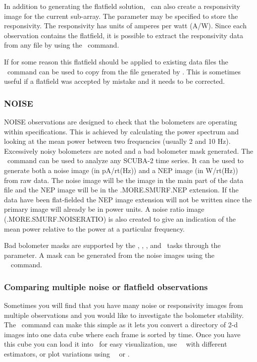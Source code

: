 \documentclass[oneside,11pt]{starlink}
\begin{document}
In addition to generating the flatfield solution, \calcflat\ can also
create a responsivity image for the current sub-array. The
 parameter may be specified to store the
responsivity. The responsivity has units of amperes per watt
(A/W). Since each observation contains the flatfield, it is possible
to extract the responsivity data from any file by using the \calcresp\
command.

If for some reason this flatfield should be applied to existing data
files the \copyflat\ command can be used to copy from the file
generated by \calcflat. This is sometimes useful if a flatfield was
accepted by mistake and it needs to be corrected.

\subsubsection{NOISE}

NOISE observations are designed to check that the bolometers are
operating within specifications. This is achieved by calculating the
power spectrum and looking at the mean power between two frequencies
(usually 2 and 10 Hz). Excessively noisy bolometers are noted and a bad
bolometer mask generated.  The \calcnoise\ command can be used to
analyze any SCUBA-2 time series. It can be used to generate both a
noise image (in pA/rt(Hz)) and a NEP image (in W/rt(Hz)) from raw
data. The noise image will be the image in the main part of the data
file and the NEP image will be in the .MORE.SMURF.NEP extension. If
the data have been flat-fielded the NEP image extension will not be
written since the primary image will already be in power units. A
noise ratio image (.MORE.SMURF.NOISERATIO) is also created to give an
indication of the mean power relative to the power at a particular frequency.

Bad bolometer masks are supported by the \flatfield, \extinction,
\remsky, and \makemap\ tasks through the \aparam{BBM}
parameter. A mask can be generated from the noise images using the
\KAPPA\ \thresh\ command.

\subsubsection{Comparing multiple noise or flatfield observations}

Sometimes you will find that you have many noise or responsivity
images from multiple observations and you would like to investigate the
bolometer stability. The \stackframes\ command can make this simple as
it lets you convert a directory of 2-d images into one data cube where
each frame is sorted by time. Once you have this cube you can load it
into \GAIA\ for easy visualization, use \KAPPA\ \collapse\ with
different estimators, or plot variations using \KAPPA\ \clinplot\ or \mlinplot.
\end{document}
